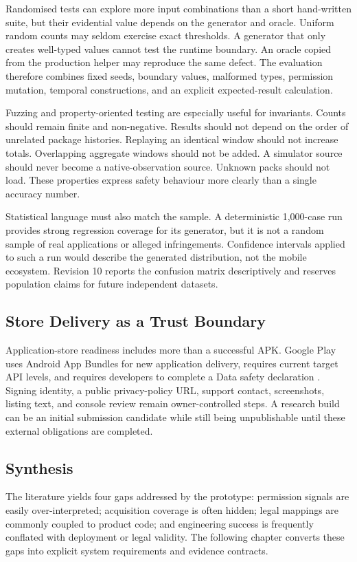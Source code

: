 Randomised tests can explore more input combinations than a short hand-written suite, but their evidential value depends on the generator and oracle. Uniform random counts may seldom exercise exact thresholds. A generator that only creates well-typed values cannot test the runtime boundary. An oracle copied from the production helper may reproduce the same defect. The evaluation therefore combines fixed seeds, boundary values, malformed types, permission mutation, temporal constructions, and an explicit expected-result calculation.

Fuzzing and property-oriented testing are especially useful for invariants. Counts should remain finite and non-negative. Results should not depend on the order of unrelated package histories. Replaying an identical window should not increase totals. Overlapping aggregate windows should not be added. A simulator source should never become a native-observation source. Unknown packs should not load. These properties express safety behaviour more clearly than a single accuracy number.

Statistical language must also match the sample. A deterministic 1,000-case run provides strong regression coverage for its generator, but it is not a random sample of real applications or alleged infringements. Confidence intervals applied to such a run would describe the generated distribution, not the mobile ecosystem. Revision 10 reports the confusion matrix descriptively and reserves population claims for future independent datasets.

\subsection{Store Delivery as a Trust Boundary}

Application-store readiness includes more than a successful APK. Google Play uses Android App Bundles for new application delivery, requires current target API levels, and requires developers to complete a Data safety declaration \cite{androidbundle2026,playtarget2026,playdatasafety2026}. Signing identity, a public privacy-policy URL, support contact, screenshots, listing text, and console review remain owner-controlled steps. A research build can be an initial submission candidate while still being unpublishable until these external obligations are completed.

\subsection{Synthesis}

The literature yields four gaps addressed by the prototype: permission signals are easily over-interpreted; acquisition coverage is often hidden; legal mappings are commonly coupled to product code; and engineering success is frequently conflated with deployment or legal validity. The following chapter converts these gaps into explicit system requirements and evidence contracts.
